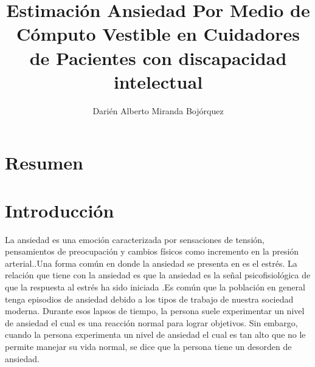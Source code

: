 \documentclass[letterpaper,12pt]{cicese}
\begin{document}
	\doublespace
	\title{Estimaci\'on Ansiedad Por Medio de C\'omputo Vestible en Cuidadores de Pacientes con discapacidad intelectual}
	\author{Dari\'en Alberto Miranda Boj\'orquez}
	\maketitle
	\newpage
	\tableofcontents
	\newpage
		\chapter{Resumen}
		\chapter{Introducci\'on} 
			
			
			La ansiedad es una emoci\'on caracterizada por sensaciones de tensi\'on, pensamientos de preocupaci\'on y cambios f\'isicos como incremento en la presi\'on arterial.\citep{psychologyapa}.Una forma com\'un en donde la ansiedad se presenta en es el estr\'es. La relaci\'on que tiene con la ansiedad es que la ansiedad es la se\~nal psicofisiol\'ogica de que la respuesta al estr\'es ha sido iniciada \citep{PMID2235645}.Es com\'un que la poblaci\'on en general tenga episodios de ansiedad debido a los tipos de trabajo de nuestra sociedad moderna. Durante esos lapsos de tiempo, la persona suele experimentar un nivel de ansiedad el cual es una reacci\'on normal para lograr objetivos. Sin embargo, cuando la persona experimenta un nivel de ansiedad el cual es tan alto que no le permite manejar su vida normal, se dice que la persona tiene un desorden de ansiedad\citep{repetto2013}.
\end{document}
